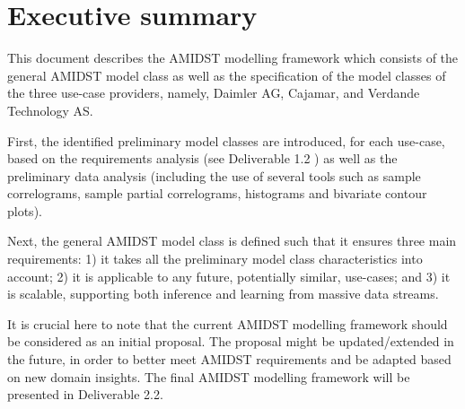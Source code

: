 \section{Executive summary}\label{section:executiveSummary}

This document describes the AMIDST modelling framework which consists of the general AMIDST model class as well as the specification of the model classes of the three use-case providers, namely, Daimler AG, Cajamar, and Verdande Technology AS.

First, the identified preliminary model classes are introduced, for each use-case, based on the requirements analysis (see Deliverable 1.2 \cite{Fer14b}) as well as the preliminary data analysis (including the use of several tools such as sample correlograms, sample partial correlograms, histograms and bivariate contour plots).

Next, the general AMIDST model class is defined such that it ensures three main requirements: 1) it takes all the preliminary model class characteristics into account; 2) it is applicable to any future, potentially similar, use-cases; and 3) it is scalable, supporting both inference and learning from massive data streams.

It is crucial here to note that the current AMIDST modelling framework should be considered as an initial proposal. The proposal might be updated/extended in the future, in order to better meet AMIDST requirements and be adapted based on new domain insights. The final AMIDST modelling framework will be presented in Deliverable 2.2.
